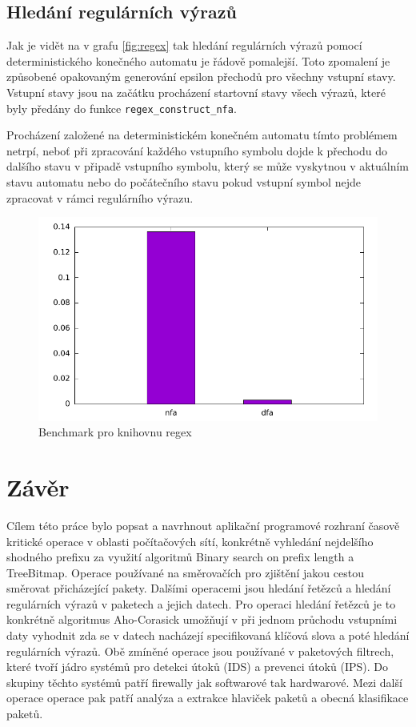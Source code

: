\section{Hledání regulárních výrazů}

Jak je vidět na v grafu \ref{fig:regex} tak hledání regulárních výrazů pomocí deterministického
konečného automatu je řádově pomalejší. Toto zpomalení je způsobené opakovaným generování
epsilon přechodů pro všechny vstupní stavy. Vstupní stavy jsou na začátku procházení
startovní stavy všech výrazů, které byly předány do funkce \texttt{regex\_construct\_nfa}.

Procházení založené na deterministickém konečném automatu tímto problémem netrpí,
neboť při zpracování každého vstupního symbolu dojde k přechodu do dalšího stavu v připadě
vstupního symbolu, který se může vyskytnou v aktuálním stavu automatu nebo do počátečního stavu
pokud vstupní symbol nejde zpracovat v rámci regulárního výrazu.

\begin{figure}[!htbp]
	\centering
	\includegraphics[scale=0.7]{fig/regex.pdf}
	\caption{Benchmark pro knihovnu regex}
\end{figure}\label{fig:regex}

\chapter{Závěr}\label{chapter:conclusion}
Cílem této práce bylo popsat a navrhnout aplikační programové rozhraní časově kritické operace v oblasti počítačových sítí,
konkrétně vyhledání nejdelšího shodného prefixu za využití algoritmů Binary search on prefix length
a TreeBitmap. Operace používané na směrovačích pro zjištění jakou cestou směrovat přicházející pakety.
Dalšími operacemi jsou hledání řetězců a hledání regulárních výrazů v paketech a jejich datech.
Pro operaci hledání řetězců je to konkrétně algoritmus Aho-Corasick \cite{aho} umožňují v
při jednom průchodu vstupními daty vyhodnit zda se v datech nacházejí specifikovaná klíčová slova
a poté hledání regulárních výrazů. Obě zmíněné operace jsou používané v paketových filtrech,
které tvoří jádro systémů pro detekci útoků (IDS) a prevenci útoků (IPS). Do skupiny těchto
systémů patří firewally jak softwarové tak hardwarové. Mezi další operace operace pak patří
analýza a extrakce hlaviček paketů a obecná klasifikace paketů.


